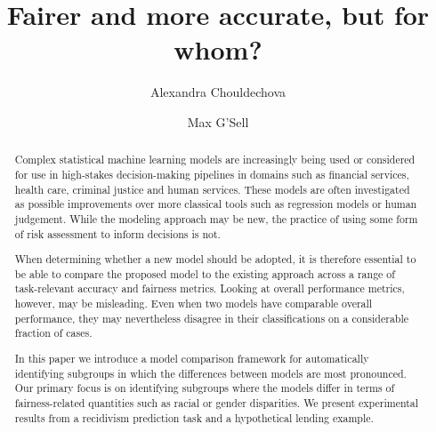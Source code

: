 \documentclass[11pt, sigconf, svgnames]{acmart}
\begin{document}
  
\title{Fairer and more accurate, but for whom?}


\author{Alexandra Chouldechova}

\author{Max G'Sell}


\renewcommand{\shortauthors}{A. Chouldechova and M. G'Sell}


\begin{abstract}
Complex statistical machine learning models are increasingly being used or considered for use in high-stakes decision-making pipelines in domains such as financial services, health care, criminal justice and human services.  These models are often investigated as possible improvements over more classical tools such as regression models or human judgement.  While the modeling approach may be new, the practice of using some form of risk assessment to inform decisions is not.  

When determining whether a new model should be adopted, it is therefore essential to be able to compare the proposed model to the existing approach across a range of task-relevant accuracy and fairness metrics.  Looking at overall performance metrics, however, may be misleading.  Even when two models have comparable overall performance, they may nevertheless disagree in their classifications on a considerable fraction of cases. 

 In this paper we introduce a model comparison framework for automatically identifying subgroups in which the differences between models are most pronounced.  Our primary focus is on identifying subgroups where the models differ in terms of fairness-related quantities such as racial or gender disparities.  We present experimental results from a recidivism prediction task and a hypothetical lending example.  
\end{abstract}
\end{document}
